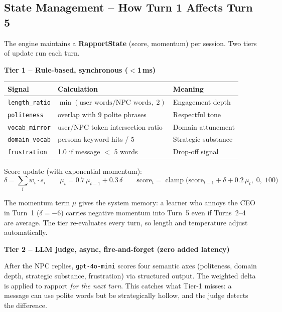\documentclass[11pt,a4paper]{article}
\begin{document}
\subsection{State Management -- How Turn 1 Affects Turn 5}

The engine maintains a \textbf{RapportState} (score, momentum) per session.
Two tiers of update run each turn.

\vspace{0.4em}
\noindent\textbf{Tier 1 -- Rule-based, synchronous ($<$1\,ms)}

\begin{center}
\begin{tabular}{@{}lll@{}}
\toprule
\textbf{Signal} & \textbf{Calculation} & \textbf{Meaning} \\
\midrule
\texttt{length\_ratio} & $\min(\text{user words}/\text{NPC words},\;2)$ & Engagement depth \\
\texttt{politeness}   & overlap with 9 polite phrases & Respectful tone \\
\texttt{vocab\_mirror}& user/NPC token intersection ratio & Domain attunement \\
\texttt{domain\_vocab}& persona keyword hits / 5 & Strategic substance \\
\texttt{frustration}  & 1.0 if message $<$ 5 words & Drop-off signal \\
\bottomrule
\end{tabular}
\end{center}

Score update (with exponential momentum):
\[
  \delta = \sum_i w_i \cdot s_i
  \qquad
  \mu_t = 0.7\,\mu_{t-1} + 0.3\,\delta
  \qquad
  \text{score}_t = \operatorname{clamp}\!\bigl(\text{score}_{t-1} + \delta + 0.2\,\mu_t,\;0,\;100\bigr)
\]

The momentum term $\mu$ gives the system memory: a learner who annoys the CEO in
Turn~1 ($\delta = -6$) carries negative momentum into Turn~5 even if Turns~2--4 are
average. The tier re-evaluates every turn, so length and temperature adjust
automatically.

\vspace{0.4em}
\noindent\textbf{Tier 2 -- LLM judge, async, fire-and-forget (zero added latency)}

After the NPC replies, \texttt{gpt-4o-mini} scores four semantic axes
(politeness, domain depth, strategic substance, frustration) via structured output.
The weighted delta is applied to rapport \emph{for the next turn}. This catches
what Tier-1 misses: a message can use polite words but be strategically hollow,
and the judge detects the difference.
\end{document}
